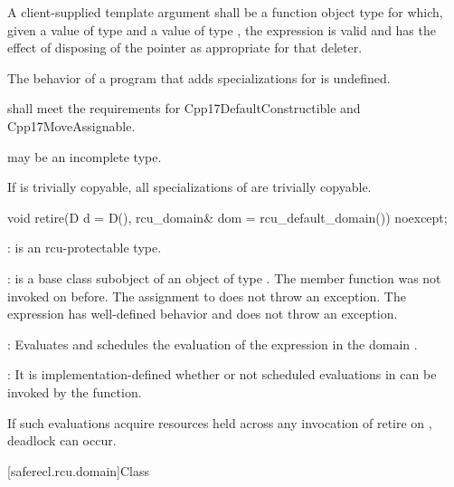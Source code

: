 \pnum
A client-supplied template argument  shall be a
function object type  for which,
given a value  of type  and a value 
of type , the expression  is valid and
has the effect of disposing of the pointer as appropriate for
that deleter.

\pnum
The behavior of a program that adds specializations for
 is undefined.

\pnum
{} shall meet the requirements for
Cpp17DefaultConstructible and Cpp17MoveAssignable.

\pnum
{} may be an incomplete type.

\pnum
If  is trivially copyable, all specializations of
 are trivially copyable.

\begin{itemdecl}
void retire(D d = D(), rcu_domain& dom = rcu_default_domain()) noexcept;
\end{itemdecl}

\begin{itemdescr}

\pnum
{}:  is an rcu-protectable type.

\pnum
{}:  is a base class subobject of
an object  of type . The member function
 was not invoked on 
before. The assignment to  does not throw an
exception. The expression  has
well-defined behavior and does not throw an exception.

\pnum	{}: Evaluates  and schedules
the evaluation of the expression 
in the domain .

\pnum	{}: It is implementation-defined whether or not scheduled
evaluations in  can be invoked by the 
function.
\begin{note}
If such evaluations acquire resources held across any invocation of
retire on , deadlock can occur.
\end{note}

\end{itemdescr}

[saferecl.rcu.domain]{Class }


